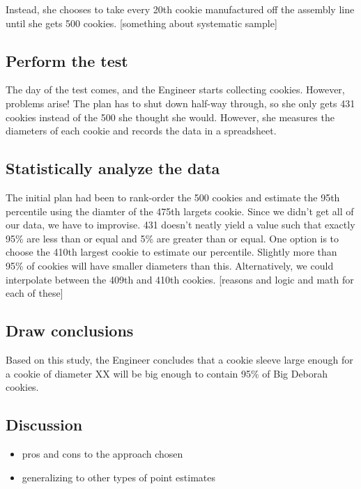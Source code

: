 \documentclass[
]{book}
\providecommand{\tightlist}{%
  \setlength{\itemsep}{0pt}\setlength{\parskip}{0pt}}
\theoremstyle{definition}
\theoremstyle{definition}
\theoremstyle{definition}
\theoremstyle{remark}
\begin{document}
Instead, she chooses to take every 20th cookie manufactured off the assembly line until she gets 500 cookies. {[}something about systematic sample{]}

\hypertarget{perform-the-test}{%
\subsection{Perform the test}\label{perform-the-test}}

The day of the test comes, and the Engineer starts collecting cookies. However, problems arise! The plan has to shut down half-way through, so she only gets 431 cookies instead of the 500 she thought she would. However, she measures the diameters of each cookie and records the data in a spreadsheet.

\hypertarget{statistically-analyze-the-data-2}{%
\subsection{Statistically analyze the data}\label{statistically-analyze-the-data-2}}

The initial plan had been to rank-order the 500 cookies and estimate the 95th percentile using the diamter of the 475th largets cookie. Since we didn't get all of our data, we have to improvise. 431 doesn't neatly yield a value such that exactly 95\% are less than or equal and 5\% are greater than or equal. One option is to choose the 410th largest cookie to estimate our percentile. Slightly more than 95\% of cookies will have smaller diameters than this. Alternatively, we could interpolate between the 409th and 410th cookies. {[}reasons and logic and math for each of these{]}

\hypertarget{draw-conclusions-2}{%
\subsection{Draw conclusions}\label{draw-conclusions-2}}

Based on this study, the Engineer concludes that a cookie sleeve large enough for a cookie of diameter XX will be big enough to contain 95\% of Big Deborah cookies.

\hypertarget{discussion}{%
\subsection{Discussion}\label{discussion}}

\begin{itemize}
\tightlist
\item
  pros and cons to the approach chosen
\item
  generalizing to other types of point estimates
\end{itemize}
\end{document}
